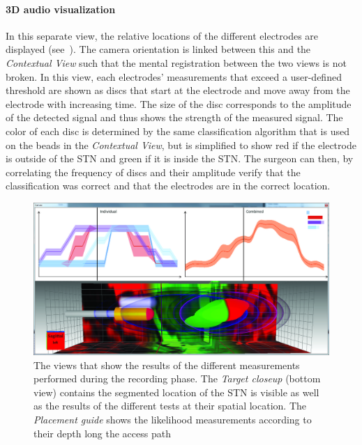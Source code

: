 \paragraph{3D audio visualization} In this separate view, the relative locations of the different electrodes are displayed (see~). The camera orientation is linked between this and the \emph{Contextual View} such that the mental registration between the two views is not broken. In this view, each electrodes' measurements that exceed a user-defined threshold are shown as discs that start at the electrode and move away from the electrode with increasing time. The size of the disc corresponds to the amplitude of the detected signal and thus shows the strength of the measured signal. The color of each disc is determined by the same classification algorithm that is used on the beads in the \emph{Contextual View}, but is simplified to show red if the electrode is outside of the STN and green if it is inside the STN. The surgeon can then, by correlating the frequency of discs and their amplitude verify that the classification was correct and that the electrodes are in the correct location.

\begin{figure}
\includegraphics[width=\linewidth]{figures/contributions/dbs/screenshot-target.jpg}
\caption{The views that show the results of the different measurements performed during the recording phase. The \emph{Target closeup} (bottom view) contains the segmented location of the STN is visible as well as the results of the different tests at their spatial location. The \emph{Placement guide} shows the likelihood measurements according to their depth long the access path}
\label{contributions:medbio:dbs:target}
\end{figure}

